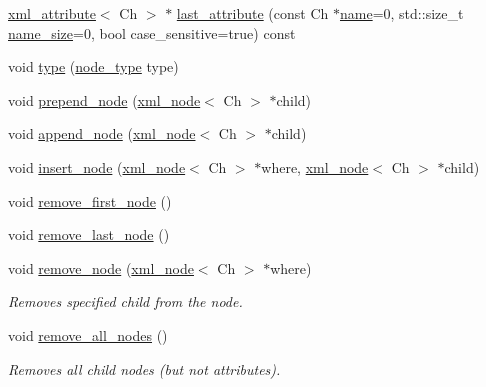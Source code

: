 \begin{DoxyCompactItemize}
\item 
\mbox{\hyperlink{classrapidxml_1_1xml__attribute}{xml\+\_\+attribute}}$<$ Ch $>$ $\ast$ \mbox{\hyperlink{classrapidxml_1_1xml__node_a67db03d1568dc6891573210ddba61520}{last\+\_\+attribute}} (const Ch $\ast$\mbox{\hyperlink{classrapidxml_1_1xml__base_aef8ae147fbee59209f714274afc80dc4}{name}}=0, std\+::size\+\_\+t \mbox{\hyperlink{classrapidxml_1_1xml__base_a20c8ffbe0c7a0b4231681ab8b99330a4}{name\+\_\+size}}=0, bool case\+\_\+sensitive=true) const
\item 
void \mbox{\hyperlink{classrapidxml_1_1xml__node_a499bbc9300c1b06821d5c08b24164c68}{type}} (\mbox{\hyperlink{namespacerapidxml_abb456db38f7efb746c4330eed6072a7c}{node\+\_\+type}} type)
\item 
void \mbox{\hyperlink{classrapidxml_1_1xml__node_ae86e92908c3eab40bbed8216e4f3f3cb}{prepend\+\_\+node}} (\mbox{\hyperlink{classrapidxml_1_1xml__node}{xml\+\_\+node}}$<$ Ch $>$ $\ast$child)
\item 
void \mbox{\hyperlink{classrapidxml_1_1xml__node_a8696d098ecc9c4d2a646b43e91d58e31}{append\+\_\+node}} (\mbox{\hyperlink{classrapidxml_1_1xml__node}{xml\+\_\+node}}$<$ Ch $>$ $\ast$child)
\item 
void \mbox{\hyperlink{classrapidxml_1_1xml__node_a666880f42a7e486d78cc45ed51c7c46d}{insert\+\_\+node}} (\mbox{\hyperlink{classrapidxml_1_1xml__node}{xml\+\_\+node}}$<$ Ch $>$ $\ast$where, \mbox{\hyperlink{classrapidxml_1_1xml__node}{xml\+\_\+node}}$<$ Ch $>$ $\ast$child)
\item 
void \mbox{\hyperlink{classrapidxml_1_1xml__node_a62bf7b276cf7a651a3337f5e0a0ef6ac}{remove\+\_\+first\+\_\+node}} ()
\item 
void \mbox{\hyperlink{classrapidxml_1_1xml__node_a9182512e948ec451a83f116cce7c7674}{remove\+\_\+last\+\_\+node}} ()
\item 
void \mbox{\hyperlink{classrapidxml_1_1xml__node_a98289923eb9e8889418a9eb0207ea35c}{remove\+\_\+node}} (\mbox{\hyperlink{classrapidxml_1_1xml__node}{xml\+\_\+node}}$<$ Ch $>$ $\ast$where)
\begin{DoxyCompactList}\small\item\em Removes specified child from the node. \end{DoxyCompactList}\item 
void \mbox{\hyperlink{classrapidxml_1_1xml__node_a95735358b079ae0adcfbbac69aa1fbc3}{remove\+\_\+all\+\_\+nodes}} ()
\begin{DoxyCompactList}\small\item\em Removes all child nodes (but not attributes). \end{DoxyCompactList}\item 

\end{DoxyCompactItemize}
